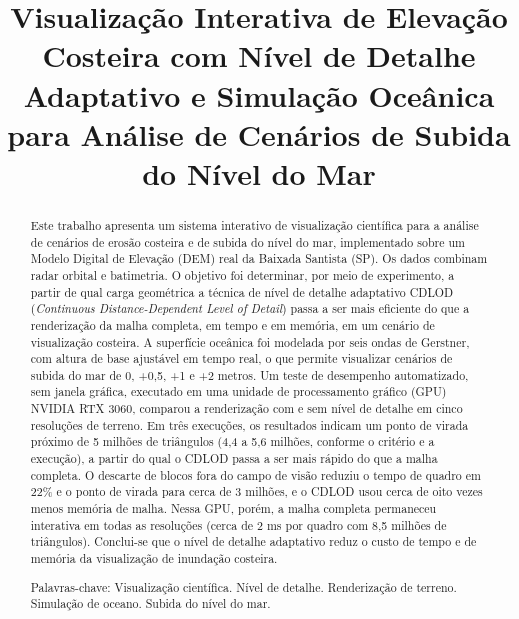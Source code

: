 \documentclass[conference]{IEEEtran}
\begin{document}
\title{Visualização Interativa de Elevação Costeira com Nível de Detalhe
Adaptativo e Simulação Oceânica para Análise de Cenários de Subida do
Nível do Mar}

\author{
}

\maketitle

\begin{abstract}
Este trabalho apresenta um sistema interativo de visualização científica
para a análise de cenários de erosão costeira e de subida do nível do mar,
implementado sobre um Modelo Digital de Elevação (DEM) real da Baixada
Santista (SP). Os dados combinam radar orbital e batimetria.  O objetivo foi determinar, por meio
de experimento, a partir de qual carga geométrica a técnica de nível de
detalhe adaptativo CDLOD (\emph{Continuous Distance-Dependent Level of
Detail}) passa a ser mais eficiente do que a renderização da malha completa,
em tempo e em memória, em um cenário de visualização costeira. A superfície oceânica
foi modelada por seis ondas de Gerstner, com altura de base ajustável em
tempo real, o que permite visualizar cenários de subida do mar de 0, +0,5,
+1 e +2 metros. Um teste de desempenho automatizado, sem janela gráfica,
executado em uma unidade de processamento gráfico (GPU) NVIDIA RTX 3060,
comparou a renderização com e sem nível de detalhe em cinco resoluções de
terreno. Em três execuções, os resultados indicam um ponto de virada próximo de 5 milhões de triângulos (4,4 a 5,6 milhões, conforme o critério e a execução), a partir do qual o CDLOD passa a ser mais rápido do que a malha completa. O descarte de blocos fora do campo de visão reduziu o tempo de quadro em 22\% e o ponto de virada para cerca de 3 milhões, e o CDLOD usou cerca de oito vezes menos memória de malha. Nessa GPU, porém, a malha completa permaneceu interativa em todas as resoluções (cerca de 2 ms por quadro com 8,5 milhões de triângulos). Conclui-se que o nível de detalhe adaptativo reduz o custo de tempo e de memória da visualização de inundação costeira.

Palavras-chave: Visualização científica. Nível de detalhe. Renderização de
terreno. Simulação de oceano. Subida do nível do mar.


\end{abstract}
\end{document}
